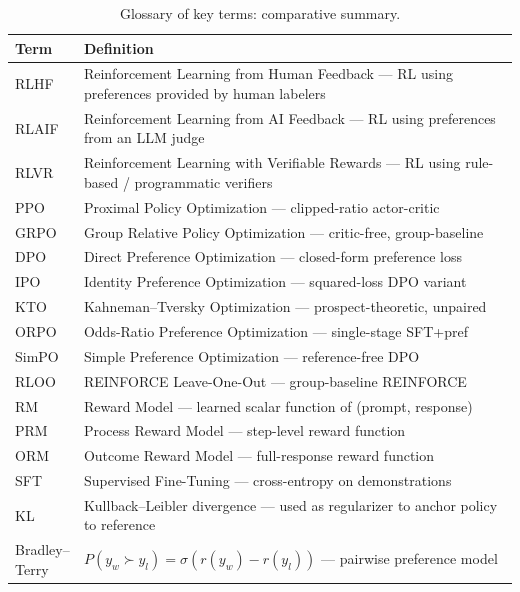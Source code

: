 \documentclass{article}
\begin{document}
\begin{table}[t]
\centering
\caption{Glossary of key terms: comparative summary.}
\label{tab:glossary-of-key-terms}
\begin{tabular}{>{\raggedright\arraybackslash}p{0.1308\linewidth}
  >{\raggedright\arraybackslash}p{0.8692\linewidth}}
\toprule
Term & Definition \\
\midrule
RLHF & Reinforcement Learning from Human Feedback --- RL using preferences provided by human labelers \\
RLAIF & Reinforcement Learning from AI Feedback --- RL using preferences from an LLM judge \\
RLVR & Reinforcement Learning with Verifiable Rewards --- RL using rule-based / programmatic verifiers \\
PPO & Proximal Policy Optimization \citep{schulman2017proximalpolicyopti} --- clipped-ratio actor-critic \\
GRPO & Group Relative Policy Optimization \citep{shao20242024} --- critic-free, group-baseline \\
DPO & Direct Preference Optimization \citep{rafailov2023directpreferenceop} --- closed-form preference loss \\
IPO & Identity Preference Optimization \citep{azar2023ageneraltheoretica} --- squared-loss DPO variant \\
KTO & Kahneman--Tversky Optimization \citep{ethayarajh2024ktomodelalignmenta} --- prospect-theoretic, unpaired \\
ORPO & Odds-Ratio Preference Optimization \citep{hong2024orpomonolithicpref} --- single-stage SFT+pref \\
SimPO & Simple Preference Optimization \citep{meng2024simposimpleprefere} --- reference-free DPO \\
RLOO & REINFORCE Leave-One-Out --- group-baseline REINFORCE \\
RM & Reward Model --- learned scalar function of (prompt, response) \\
PRM & Process Reward Model --- step-level reward function \citep{lightman2023letsverifystepbyst} \\
ORM & Outcome Reward Model --- full-response reward function \\
SFT & Supervised Fine-Tuning --- cross-entropy on demonstrations \\
KL & Kullback--Leibler divergence --- used as regularizer to anchor policy to reference \\
Bradley--Terry & \(P(y_w \succ y_l) = \sigma(r(y_w) - r(y_l))\) --- pairwise preference model \\

\end{tabular}
\end{table}
\end{document}

